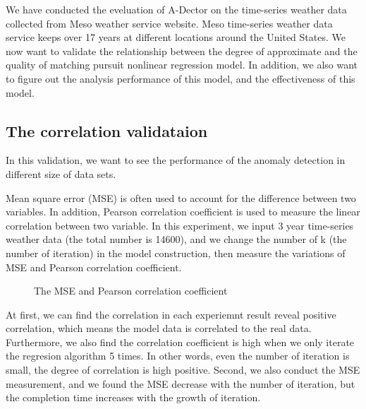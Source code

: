 \documentclass{vgtc}                          %
\begin{document}
We have conducted the eveluation of A-Dector on the time-series weather data collected from Meso weather service website. Meso time-series weather data service keeps over 17 years at different locations around the United States. We now want to validate the relationship between the degree of approximate and the quality of matching pursuit nonlinear regression model. In addition, we also want to figure out the analysis performance of this model, and the effectiveness of this model.

\subsection{The correlation validataion}

	In this validation, we want to see the performance of the anomaly detection in different size of data sets. 

Mean square error (MSE) is often used to account for the difference between two variables. In addition, Pearson correlation coefficient is used to measure the linear correlation between two variable. In this experiment, we input 3 year time-series weather data (the total number is 14600), and we change the number of k (the number of iteration) in the model construction, then measure the variations of MSE and Pearson correlation coefficient. 
\begin{figure}[htb]
	\caption{The MSE and Pearson correlation coefficient}
\end{figure}

	At first, we can find the correlation in each experiemnt result reveal positive correlation, which means the model data is correlated to the real data. Furthermore, we also find the correlation coefficient is high when we only iterate the regresion algorithm 5 times. In other words, even the number of iteration is small, the degree of correlation is high positive. Second, we also conduct the MSE measurement, and we found the MSE decrease with the number of iteration, but the completion time increases with the growth of iteration.
	
\end{document}
